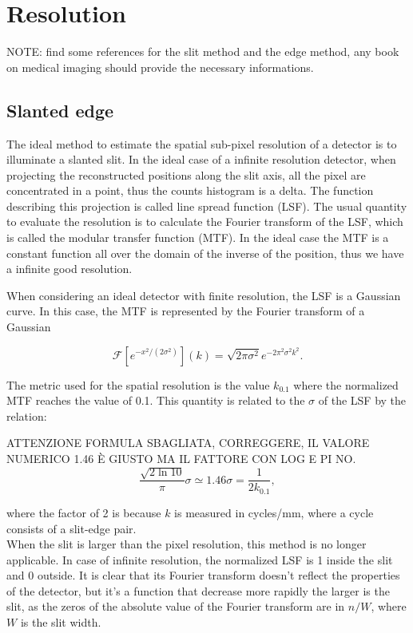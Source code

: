 \chapter{Resolution}
\label{chap:resolution}
NOTE: find some references for the slit method and the edge method, any book on medical imaging should provide the necessary informations.


\section{Slanted edge}
The ideal method to estimate the spatial sub-pixel resolution of a detector is to illuminate a slanted slit. In the ideal case of a infinite resolution detector, when projecting the reconstructed positions along the slit axis, all the pixel are concentrated in a point, thus the counts histogram is a delta. The function describing this projection is called line spread function (LSF). The usual quantity to evaluate the resolution is to calculate the Fourier transform of the LSF, which is called the modular transfer function (MTF). In the ideal case the MTF is a constant function all over the domain of the inverse of the position, thus we have a infinite good resolution.

When considering an ideal detector with finite resolution, the LSF is a Gaussian curve. In this case, the MTF is represented by the Fourier transform of a Gaussian

\begin{equation}
\mathcal{F}[e^{-x^2/(2\sigma^2)}](k) = \sqrt{2\pi \sigma ^2} e^{-2\pi^2\sigma^2 k^2}.
\end{equation}


The metric used for the spatial resolution is the value $k_{0.1}$ where the normalized MTF reaches the value of 0.1. This quantity is related to the $\sigma$ of the LSF by the relation:

ATTENZIONE FORMULA SBAGLIATA, CORREGGERE, IL VALORE NUMERICO 1.46 È GIUSTO MA IL FATTORE CON LOG E PI NO.
\begin{equation}
\frac{\sqrt{2 \ln{10}}}{\pi} \sigma \simeq 1.46 \sigma = \frac{1}{2 k_{0.1}},
\end{equation}

where the factor of 2 is because $k$ is measured in cycles/mm, where a cycle consists of a slit-edge pair.\\

When the slit is larger than the pixel resolution, this method is no longer applicable. In case of infinite resolution, the normalized LSF is 1 inside the slit and 0 outside. It is clear that its Fourier transform doesn't reflect the properties of the detector, but it's a function that decrease more rapidly the larger is the slit, as the zeros of the absolute value of the Fourier transform are in $n/W$, where $W$ is the slit width.

